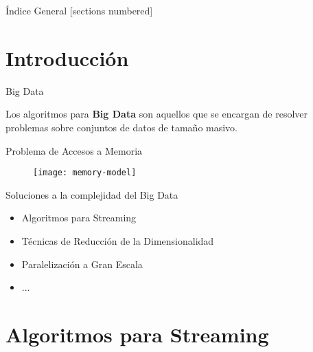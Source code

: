 \documentclass[12pt]{beamer}
\begin{document}
  \maketitle

  \begin{frame}{Índice General}
    [sections numbered]
    \tableofcontents[hideallsubsections]
  \end{frame}

  \section{Introducción}

    \begin{frame}[fragile]{Big Data}

      Los algoritmos para \textbf{Big Data} son aquellos que se encargan de resolver problemas sobre conjuntos de datos de tamaño masivo.

    \end{frame}

    \begin{frame}[fragile]{Problema de Accesos a Memoria}

      \begin{figure}
        \texttt{[image: memory-model]}
        \caption{}
      \end{figure}

    \end{frame}

    \begin{frame}[fragile]{Soluciones a la complejidad del Big Data}

      \begin{itemize}
        \item Algoritmos para Streaming
        \item Técnicas de Reducción de la Dimensionalidad
        \item Paralelización a Gran Escala
        \item ...
      \end{itemize}

    \end{frame}

  \section{Algoritmos para Streaming}
\end{document}
